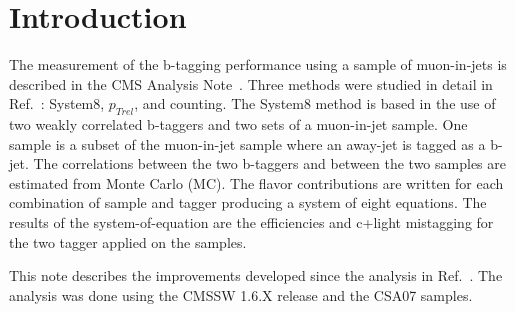 \section{Introduction}

The measurement of the b-tagging performance using a sample of muon-in-jets is described
in the CMS Analysis Note~\cite{ref:btag_oldnote}. Three methods were
studied in detail in Ref.~\cite{ref:btag_oldnote}: System8, $p_{Trel}$,
and counting. The System8 method is based in the use of two weakly correlated
b-taggers and two sets of a muon-in-jet sample. One sample is a subset of the
muon-in-jet sample where an away-jet is tagged as a b-jet. The correlations
between the two b-taggers and between the two samples are estimated
from Monte Carlo (MC). The flavor contributions are written for 
each combination of sample and tagger producing a system of eight
equations. The results of the system-of-equation are the
efficiencies and c+light mistagging 
for the two tagger applied on the samples. 

This note describes the improvements developed since the analysis in Ref.~\cite{ref:btag_oldnote}. The analysis was done using the CMSSW 1.6.X release and the
CSA07 samples.
 
